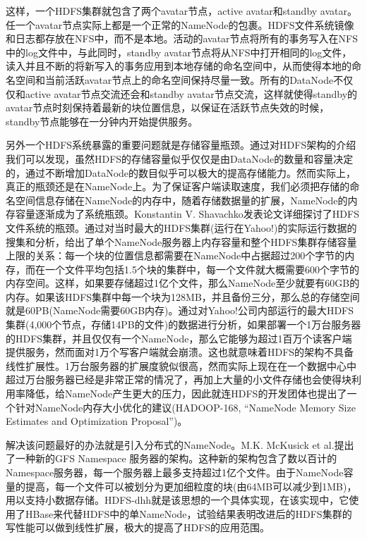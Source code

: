 这样，一个HDFS集群就包含了两个avatar节点，active avatar和standby avatar。任一个avatar节点实际上都是一个正常的NameNode的包裹。HDFS文件系统镜像和日志都存放在NFS中，而不是本地。活动的avatar节点将所有的事务写入在NFS中的log文件中，与此同时，standby avatar节点将从NFS中打开相同的log文件，读入并且不断的将新写入的事务应用到本地存储的命名空间中，从而使得本地的命名空间和当前活跃avatar节点上的命名空间保持尽量一致。所有的DataNode不仅仅和active avatar节点交流还会和standby avatar节点交流，这样就使得standby的avatar节点时刻保持着最新的块位置信息，以保证在活跃节点失效的时候，standby节点能够在一分钟内开始提供服务。

另外一个HDFS系统暴露的重要问题就是存储容量瓶颈。通过对HDFS架构的介绍我们可以发现，虽然HDFS的存储容量似乎仅仅是由DataNode的数量和容量决定的，通过不断增加DataNode的数目似乎可以极大的提高存储能力。然而实际上，真正的瓶颈还是在NameNode上。为了保证客户端读取速度，我们必须把存储的命名空间信息存储在NameNode的内存中，随着存储数据量的扩展，NameNode的内存容量逐渐成为了系统瓶颈。Konstantin V. Shavachko发表论文详细探讨了HDFS文件系统的瓶颈。通过对当时最大的HDFS集群(运行在Yahoo!)的实际运行数据的搜集和分析，给出了单个NameNode服务器上内存容量和整个HDFS集群存储容量上限的关系：每一个块的位置信息都需要在NameNode中占据超过200个字节的内存，而在一个文件平均包括1.5个块的集群中，每一个文件就大概需要600个字节的内存空间。这样，如果要存储超过1亿个文件，那么NameNode至少就要有60GB的内存。如果该HDFS集群中每一个块为128MB，并且备份三分，那么总的存储空间就是60PB(NameNode需要60GB内存)。通过对Yahoo!公司内部运行的最大HDFS集群(4,000个节点，存储14PB的文件)的数据进行分析，如果部署一个1万台服务器的HDFS集群，并且仅仅有一个NameNode，那么它能够为超过1百万个读客户端提供服务，然而面对1万个写客户端就会崩溃。这也就意味着HDFS的架构不具备线性扩展性。1万台服务器的扩展度貌似很高，然而实际上现在在一个数据中心中超过万台服务器已经是非常正常的情况了，再加上大量的小文件存储也会使得块利用率降低，给NameNode产生更大的压力，因此就连HDFS的开发团体也提出了一个针对NameNode内存大小优化的建议(HADOOP-168, “NameNode Memory Size Estimates and Optimization Proposal”)。

解决该问题最好的办法就是引入分布式的NameNode。M.K. McKusick et al.提出了一种新的GFS Namespace 服务器的架构。这种新的架构包含了数以百计的Namespace服务器，每一个服务器上最多支持超过1亿个文件。由于NameNode容量的提高，每一个文件可以被划分为更加细粒度的块(由64MB可以减少到1MB)，用以支持小数据存储。HDFS-dhh就是该思想的一个具体实现，在该实现中，它使用了HBase来代替HDFS中的单NameNode，试验结果表明改进后的HDFS集群的写性能可以做到线性扩展，极大的提高了HDFS的应用范围。

